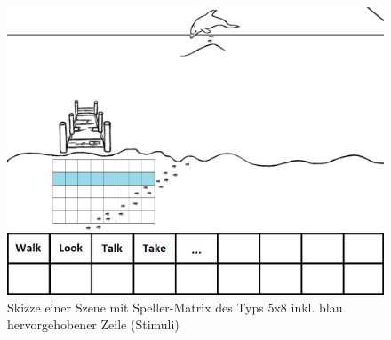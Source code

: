 \begin{figure}[h!]
\begin{center}
\includegraphics[scale=0.3]{images/szene1konzept.png}
\caption{Skizze einer Szene mit Speller-Matrix des Typs 5x8 inkl. blau hervorgehobener Zeile (Stimuli)}
\label{gameconcept}
\end{center}
\end{figure}









































